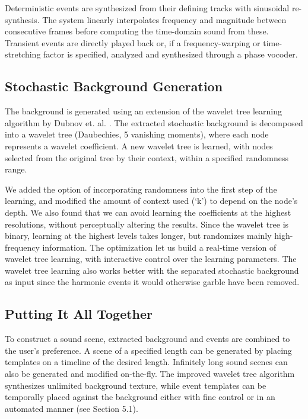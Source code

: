 \documentclass[twoside]{article}
\begin{document}
Deterministic events are synthesized from their defining tracks with 
sinusoidal re-synthesis. The system linearly interpolates frequency and magnitude 
between consecutive frames before computing the time-domain sound from 
these. Transient events are directly played back or, if a frequency-warping or time-stretching 
factor is specified, analyzed and synthesized through a phase vocoder.

\subsection{Stochastic Background Generation}

The background is generated using an extension of the wavelet tree learning 
algorithm by Dubnov et. al. \cite{paper:85:Dubnov02}. The extracted 
stochastic background is decomposed into a wavelet tree (Daubechies, 5 vanishing moments),  
where each node represents a wavelet coefficient. 
A new wavelet tree is learned, with nodes selected from the original tree 
by their context, within a specified randomness range.

We added the option of incorporating randomness into the first step of the 
learning, and modified the amount of context used (`k') to depend on 
the node's depth. We also found 
that we can avoid learning the coefficients at the highest resolutions, 
without perceptually altering the results. Since the wavelet tree is binary, learning 
at the highest levels takes longer, but randomizes mainly high-frequency information. 
The optimization let us build a real-time version of wavelet tree learning, 
with interactive control over the learning parameters. The wavelet tree learning also works 
better with the separated stochastic background as input since the harmonic events 
it would otherwise garble have been removed. 

\subsection{Putting It All Together}

To construct a sound scene, extracted background and events are combined 
to the user's preference. A scene of a specified length 
can be generated by placing templates on a timeline of the desired length. 
Infinitely long sound scenes can also be generated and modified on-the-fly. 
The improved wavelet tree algorithm synthesizes unlimited background texture, while 
event templates can be temporally placed against the background either with fine 
control or in an automated manner (see Section 5.1). 
\end{document}
